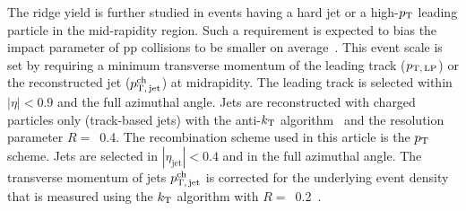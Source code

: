 The ridge yield is further studied in events having a hard jet or a high-$p_\mathrm{T}$ leading particle in the mid-rapidity region. Such a requirement is expected to bias the impact parameter of pp collisions to be smaller on average~\cite{Sjostrand:1986ep,Frankfurt:2010ea}.
This event scale is set by requiring a minimum transverse momentum of the leading track ($p_\mathrm{T,\,LP}$) or the reconstructed jet ($p_\mathrm{T,\,jet}^\mathrm{ch}$) at midrapidity. The leading track is selected within $|\eta|<0.9$ and the full azimuthal angle. Jets are reconstructed with charged particles only (track-based jets) with the anti-$k_{\rm{T}}$ algorithm~\cite{Cacciari:2008gp,Cacciari:2011ma} and the resolution parameter $R=$~0.4. The recombination scheme used in this article is the $p_\mathrm{T}$ scheme. Jets are selected in $|\eta_\mathrm{jet}|<0.4$ and in the full azimuthal angle. The transverse momentum of jets $p_\mathrm{T,\,jet}^\mathrm{ch}$ is corrected for the underlying event density that is measured using the $k_{\rm{T}}$ algorithm with $R=$~0.2~\cite{Acharya:2018eat}. 

